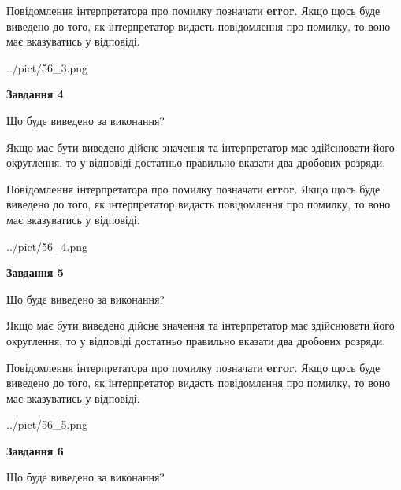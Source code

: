 \documentclass[12pt, ukrainian]{article}
\begin{document}
{\begin {Large}
Повідомлення інтерпретатора про помилку позначати \textbf{error}.
Якщо щось буде виведено до того, як інтерпретатор видасть повідомлення про помилку, 
то воно має вказуватись у відповіді. \par

\begin{center}
	{../pict/56_3.png}
\end{center}
\newpage

{\begin {center}\textbf{Завдання 4}\end {center}}\par
Що буде виведено за виконання? \par

Якщо має бути виведено дійсне значення та інтерпретатор має здійснювати його округлення, 
то у відповіді достатньо правильно вказати два дробових розряди.

Повідомлення інтерпретатора про помилку позначати \textbf{error}.
Якщо щось буде виведено до того, як інтерпретатор видасть повідомлення про помилку, 
то воно має вказуватись у відповіді. \par

\begin{center}
	{../pict/56_4.png}
\end{center}
\newpage

{\begin {center}\textbf{Завдання 5}\end {center}}\par
Що буде виведено за виконання? \par

Якщо має бути виведено дійсне значення та інтерпретатор має здійснювати його округлення, 
то у відповіді достатньо правильно вказати два дробових розряди.

Повідомлення інтерпретатора про помилку позначати \textbf{error}.
Якщо щось буде виведено до того, як інтерпретатор видасть повідомлення про помилку, 
то воно має вказуватись у відповіді. \par

\begin{center}
	{../pict/56_5.png}
\end{center}
\newpage

{\begin {center}\textbf{Завдання 6}\end {center}}\par
Що буде виведено за виконання? \par


\end{Large}}
\end{document}
